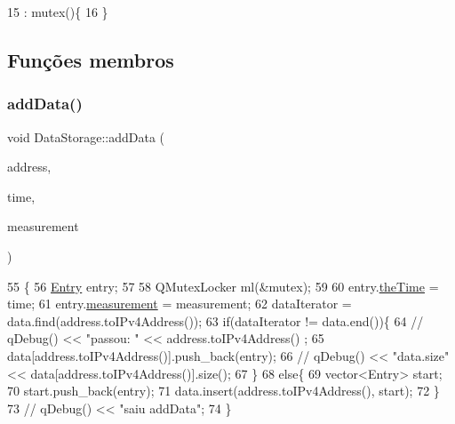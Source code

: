 \begin{DoxyCode}
15                          : mutex()\{
16 \}
\end{DoxyCode}


\subsection{Funções membros}
\mbox{\label{class_data_storage_ab46b18762db5b17b3e0a97150079cb78}} 
\subsubsection{\texorpdfstring{add\+Data()}{addData()}}
{\footnotesize\ttfamily void Data\+Storage\+::add\+Data (\begin{DoxyParamCaption}\item[{Q\+Host\+Address}]{address,  }\item[{qint64}]{time,  }\item[{float}]{measurement }\end{DoxyParamCaption})}


\begin{DoxyCode}
55                                                                              \{
56   \mbox{\hyperlink{struct_entry}{Entry}} entry;
57 
58   QMutexLocker ml(&mutex);
59 
60   entry.\mbox{\hyperlink{struct_entry_a0a78d616ccc342ef6c34d849288d7c85}{theTime}} = time;
61   entry.\mbox{\hyperlink{struct_entry_a78ebc6241b1baaa2551b2cf89f519960}{measurement}} = measurement;
62   dataIterator = data.find(address.toIPv4Address());
63   \textcolor{keywordflow}{if}(dataIterator != data.end())\{
64   \textcolor{comment}{//  qDebug() << "passou: " << address.toIPv4Address() ;}
65     data[address.toIPv4Address()].push\_back(entry);
66   \textcolor{comment}{//  qDebug() << "data.size" << data[address.toIPv4Address()].size();}
67   \}
68   \textcolor{keywordflow}{else}\{
69     vector<Entry> start;
70     start.push\_back(entry);
71     data.insert(address.toIPv4Address(), start);
72   \}
73  \textcolor{comment}{// qDebug() << "saiu addData";}
74 \}
\end{DoxyCode}
\mbox{\label{class_data_storage_a6d1d74566ca198c807a9dbbb16019472}} 
